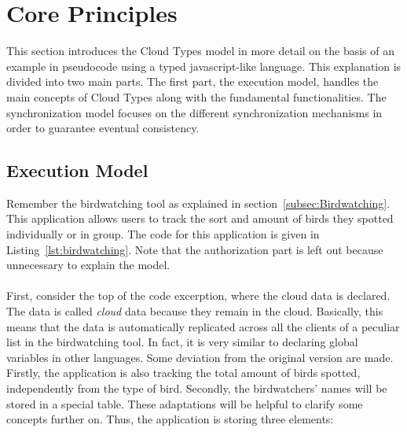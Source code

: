 \documentclass[a4paper,12pt]{report}
\begin{document}
\section{Core Principles}\label{sec:CorePrinciples}

This section introduces the Cloud Types model in more detail on the basis of an example in pseudocode using a typed javascript-like language. This explanation is divided into two main parts. The first part, the execution model, handles the main concepts of Cloud Types along with the fundamental functionalities. The synchronization model focuses on the different synchronization mechanisms in order to guarantee eventual consistency.



\subsection{Execution Model}\label{subsec:ExecutionModel}

Remember the birdwatching tool as explained in section~\ref{subsec:Birdwatching}. This application allows users to track the sort and amount of birds they spotted individually or in group. The code for this application is given in Listing~\ref{lst:birdwatching}. Note that the authorization part is left out because unnecessary to explain the model. \\
\\
First, consider the top of the code excerption, where the cloud data is declared. The data is called \textit{cloud} data because they remain in the cloud. Basically, this means that the data is automatically replicated across all the clients of a peculiar list in the birdwatching tool. In fact, it is very similar to declaring global variables in other languages. Some deviation from the original version are made. Firstly, the application is also tracking the total amount of birds spotted, independently from the type of bird. Secondly, the birdwatchers' names will be stored in a special table. These adaptations will be helpful to clarify some concepts further on. Thus, the application is storing three elements:
\end{document}
